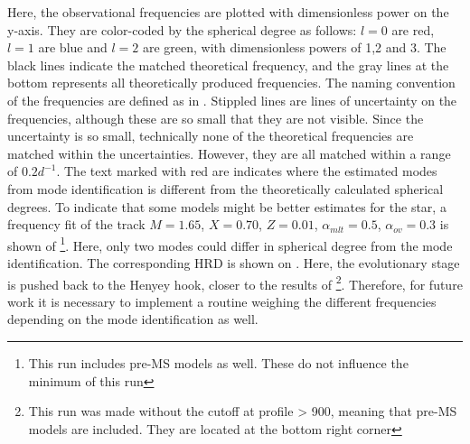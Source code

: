  Here, the observational frequencies are plotted with dimensionless power on the y-axis. They are color-coded by the spherical degree as follows: $l=0$ are red, $l=1$ are blue and  $l=2$ are green, with dimensionless powers of 1,2 and 3. The black lines indicate the matched theoretical frequency, and the gray lines at the bottom represents all theoretically produced frequencies. The naming convention of the frequencies are defined as in . Stippled lines are lines of uncertainty on the frequencies, although these are so small that they are not visible. Since the uncertainty is so small, technically none of the theoretical frequencies are matched within the uncertainties. However, they are all matched within a range of $0.2 d^{-1}$. The text marked with red are indicates where the estimated modes from mode identification is different from the theoretically calculated spherical degrees. To indicate that some models might be better estimates for the star, a frequency fit of the track $M=1.65$, $X=0.70$, $Z=0.01$, $\alpha_{mlt} = 0.5$, $\alpha_{ov}=0.3$ is shown of \footnote{This run includes pre-MS models as well. These do not influence the minimum \chis of this run}. Here, only two modes could differ in spherical degree from the mode identification. The corresponding HRD is shown on . Here, the evolutionary stage is pushed back to the Henyey hook, closer to the results of \citet{lenz2010delta}\footnote{This run was made without the cutoff at profile > 900, meaning that pre-MS models are included. They are located at the bottom right corner}. Therefore, for future work it is necessary to implement a routine weighing the different frequencies depending on the mode identification as well. 
 
